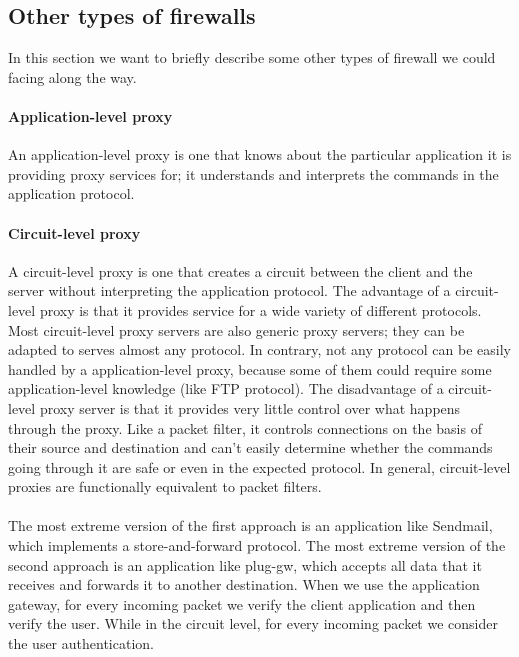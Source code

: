 \documentclass[11pt]{article}
\begin{document}
\subsection{Other types of firewalls}
In this section we want to briefly describe some other types of firewall we could facing along the way.
\paragraph{Application-level proxy} An application-level proxy is one that knows about the particular application it is providing proxy services for; it understands and interprets the commands in the application protocol. 
\paragraph{Circuit-level proxy} A circuit-level proxy is one that creates a circuit between the client and the server without interpreting the application protocol. The advantage of a circuit-level proxy is that it provides service for a wide variety of different protocols. Most circuit-level proxy servers are also generic proxy servers; they can be adapted to serves almost any protocol. In contrary, not any protocol can be easily handled by a application-level proxy, because some of them could require some application-level knowledge (like FTP protocol). The disadvantage of a circuit-level proxy server is that it provides very little control over what happens through the proxy. Like a packet filter, it controls connections on the basis of their source and destination and can't easily determine whether the commands going through it are safe or even in the expected protocol. In general, circuit-level proxies are functionally equivalent to packet filters.\\\\The most extreme version of the first approach is an application like Sendmail, which implements a store-and-forward protocol. The most extreme version of the second approach is an application like plug-gw, which accepts all data that it receives and forwards it to another destination. When we use the application gateway, for every incoming packet we verify the client application and then verify the user. While in the circuit level, for every incoming packet we consider the user authentication.
\end{document}
